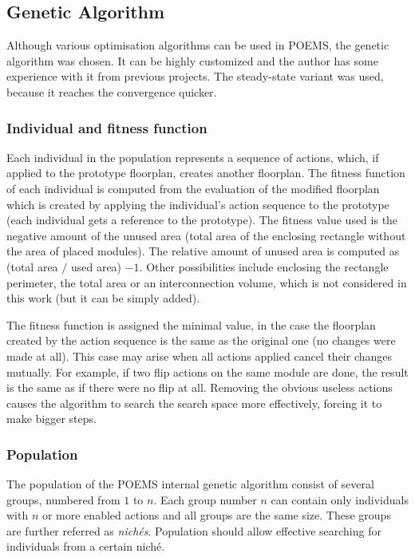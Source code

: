 \subsection{Genetic Algorithm}

Although various optimisation algorithms can be used in POEMS, the genetic algorithm was chosen. It can be highly customized and the author has some experience with it from previous projects. The steady-state variant was used, because it reaches the convergence quicker.

\subsubsection{Individual and fitness function}

Each individual in the population represents a sequence of actions, which, if applied to the prototype floorplan, creates another floorplan. The fitness function of each individual is computed from the evaluation of the modified floorplan which is created by applying the individual's action sequence to the prototype (each individual gets a reference to the prototype). The fitness value used is the negative amount of the unused area (total area of the enclosing rectangle without the area of placed modules). The relative amount of unused area is computed as (total area $/$ used area) $-1$. Other possibilities include enclosing the rectangle perimeter, the total area or an interconnection volume, which is not considered in this work (but it can be simply added).

The fitness function is assigned the minimal value, in the case the floorplan created by the action sequence is the same as the original one (no changes were made at all). This case may arise when all actions applied cancel their changes mutually. For example, if two flip actions on the same module are done, the result is the same as if there were no flip at all. Removing the obvious useless actions causes the algorithm to search the search space more effectively, forcing it to make bigger steps.

\subsubsection{Population}

The population of the POEMS internal genetic algorithm consist of several groups, numbered from $1$ to $n$. Each group number $n$ can contain only individuals with $n$ or more enabled actions and all groups are the same size. These groups are further referred as {\em nichés}. Population should allow effective searching for individuals from a certain niché. 

